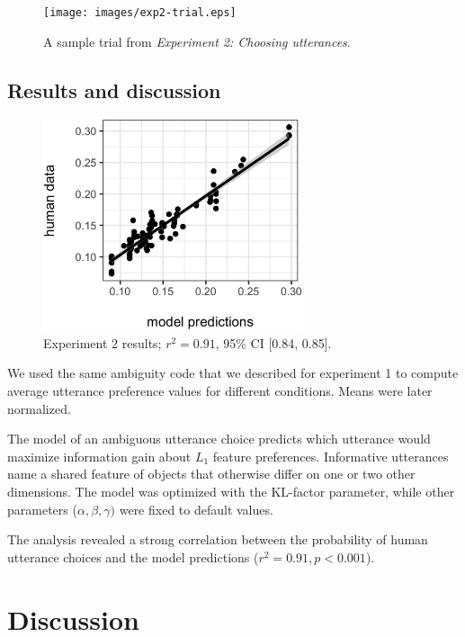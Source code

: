 \documentclass[10pt,a4paper]{article}
\begin{document}
\begin{figure}[ht]
	\centering
	\texttt{[image: images/exp2-trial.eps]}
	\caption{A sample trial from \emph{Experiment 2: Choosing utterances}.}\label{exp2-trial}
\end{figure}

\subsection{Results and discussion}

\begin{figure}[ht]
	\centering
	\includegraphics[width=3in]{images/X3-scatter-CogSci.eps}
	\caption{Experiment 2 results; $r^{2}=0.91$, 95\% CI [0.84, 0.85].}\label{exp2-results}
\end{figure}


We used the same ambiguity code that we described for experiment 1 to compute average utterance preference values for different conditions. Means were later normalized.

The model of an ambiguous utterance choice predicts which utterance would maximize information gain about $L_1$ feature preferences. Informative utterances name a shared feature of objects that otherwise differ on one or two other dimensions. The model was optimized with the KL-factor parameter, while other parameters ($\alpha, \beta, \gamma)$ were fixed to default values.

The analysis revealed a strong correlation between the probability of human utterance choices and the model predictions ($r^2 = 0.91, p < 0.001$).

\section{Discussion}
\end{document}
